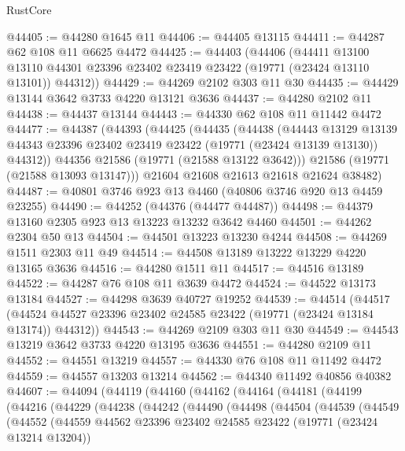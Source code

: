 \begin{lexlean}{RustCore}
\begin{coremodule}
@44405 := @44280 @1645 @11
@44406 := @44405 @13115
@44411 := @44287 @62 @108 @11 @6625 @4472
@44425 := @44403
    (@44406
      (@44411
        @13100
        @13110
        @44301
        @23396
        @23402
        @23419
        @23422
        (@19771 (@23424 @13110 @13101))
        @44312))
@44429 := @44269 @2102 @303 @11 @30
@44435 := @44429 @13144 @3642 @3733 @4220 @13121 @3636
@44437 := @44280 @2102 @11
@44438 := @44437 @13144
@44443 := @44330 @62 @108 @11 @11442 @4472
@44477 := @44387
    (@44393
      (@44425
        (@44435
          (@44438
            (@44443
              @13129
              @13139
              @44343
              @23396
              @23402
              @23419
              @23422
              (@19771 (@23424 @13139 @13130))
              @44312))
          @44356
          @21586
          (@19771 (@21588 @13122 @3642)))
        @21586
        (@19771 (@21588 @13093 @13147)))
      @21604
      @21608
      @21613
      @21618
      @21624
      @38482)
@44487 := @40801 @3746 @923 @13 @4460 (@40806 @3746 @920 @13 @4459 @23255)
@44490 := @44252 (@44376 (@44477 @44487))
@44498 := @44379 @13160 @2305 @923 @13 @13223 @13232 @3642 @4460
@44501 := @44262 @2304 @50 @13
@44504 := @44501 @13223 @13230 @4244
@44508 := @44269 @1511 @2303 @11 @49
@44514 := @44508 @13189 @13222 @13229 @4220 @13165 @3636
@44516 := @44280 @1511 @11
@44517 := @44516 @13189
@44522 := @44287 @76 @108 @11 @3639 @4472
@44524 := @44522 @13173 @13184
@44527 := @44298 @3639 @40727 @19252
@44539 := @44514
    (@44517 (@44524 @44527 @23396 @23402 @24585 @23422 (@19771 (@23424 @13184 @13174)) @44312))
@44543 := @44269 @2109 @303 @11 @30
@44549 := @44543 @13219 @3642 @3733 @4220 @13195 @3636
@44551 := @44280 @2109 @11
@44552 := @44551 @13219
@44557 := @44330 @76 @108 @11 @11492 @4472
@44559 := @44557 @13203 @13214
@44562 := @44340 @11492 @40856 @40382
@44607 := @44094
    (@44119
      (@44160
        (@44162
          (@44164
            (@44181
              (@44199
                (@44216
                  (@44229
                    (@44238
                      (@44242
                        (@44490
                          (@44498
                            (@44504
                              (@44539
                                (@44549
                                  (@44552
                                    (@44559
                                      @44562
                                      @23396
                                      @23402
                                      @24585
                                      @23422
                                      (@19771 (@23424 @13214 @13204))

\end{coremodule}
\end{lexlean}
